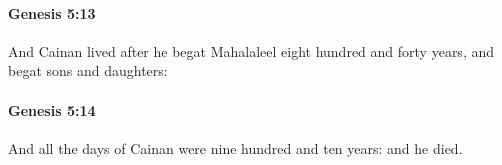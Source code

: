 		\paragraph{Genesis 5:13} %
			\label{GENESIS-5-13}

			And Cainan lived after he begat Mahalaleel eight hundred and forty years, and begat sons and daughters:


		\paragraph{Genesis 5:14} %
			\label{GENESIS-5-14}

			And all the days of Cainan were nine hundred and ten years: and he died.



